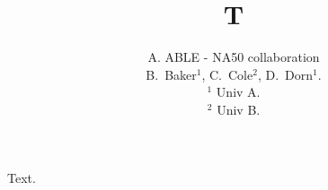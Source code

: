 
\title{T}
\author{ A. ABLE - NA50 collaboration
\\
\vspace{0.3cm}
B.~Baker$^{1}$,
C.~Cole$^{2}$,
D.~Dorn$^{1}$.
\\
$^{1}$ Univ A.\\
$^{2}$ Univ B.
}
\maketitle
Text.

